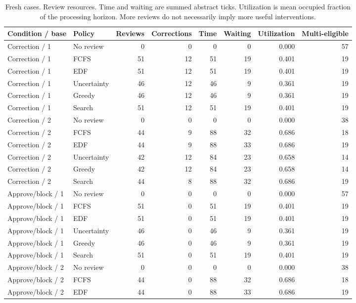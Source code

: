 \begin{table}[t]
\caption{Fresh cases. Review resources. Time and waiting are summed abstract ticks. Utilization is mean occupied fraction of the processing horizon. More reviews do not necessarily imply more useful interventions.}
\centering\small
\begin{tabular}{llrrrrrr}
\toprule
Condition / base & Policy & Reviews & Corrections & Time & Waiting & Utilization & Multi-eligible \\
\midrule
Correction / 1 & No review & 0 & 0 & 0 & 0 & 0.000 & 57 \\
Correction / 1 & FCFS & 51 & 12 & 51 & 19 & 0.401 & 19 \\
Correction / 1 & EDF & 51 & 12 & 51 & 19 & 0.401 & 19 \\
Correction / 1 & Uncertainty & 46 & 12 & 46 & 9 & 0.361 & 19 \\
Correction / 1 & Greedy & 46 & 12 & 46 & 9 & 0.361 & 19 \\
Correction / 1 & Search & 51 & 12 & 51 & 19 & 0.401 & 19 \\
Correction / 2 & No review & 0 & 0 & 0 & 0 & 0.000 & 38 \\
Correction / 2 & FCFS & 44 & 9 & 88 & 32 & 0.686 & 18 \\
Correction / 2 & EDF & 44 & 9 & 88 & 33 & 0.686 & 19 \\
Correction / 2 & Uncertainty & 42 & 12 & 84 & 23 & 0.658 & 14 \\
Correction / 2 & Greedy & 42 & 12 & 84 & 23 & 0.658 & 14 \\
Correction / 2 & Search & 44 & 8 & 88 & 32 & 0.686 & 19 \\
Approve/block / 1 & No review & 0 & 0 & 0 & 0 & 0.000 & 57 \\
Approve/block / 1 & FCFS & 51 & 0 & 51 & 19 & 0.401 & 19 \\
Approve/block / 1 & EDF & 51 & 0 & 51 & 19 & 0.401 & 19 \\
Approve/block / 1 & Uncertainty & 46 & 0 & 46 & 9 & 0.361 & 19 \\
Approve/block / 1 & Greedy & 46 & 0 & 46 & 9 & 0.361 & 19 \\
Approve/block / 1 & Search & 51 & 0 & 51 & 19 & 0.401 & 19 \\
Approve/block / 2 & No review & 0 & 0 & 0 & 0 & 0.000 & 38 \\
Approve/block / 2 & FCFS & 44 & 0 & 88 & 32 & 0.686 & 18 \\
Approve/block / 2 & EDF & 44 & 0 & 88 & 33 & 0.686 & 19 \\

\end{tabular}
\end{table}
